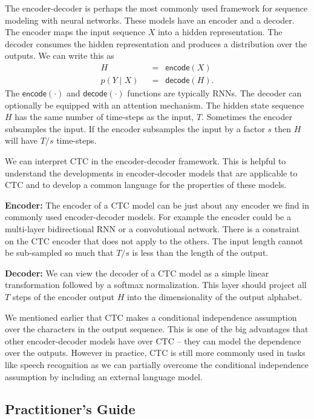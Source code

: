 The encoder-decoder is perhaps the most commonly used framework for sequence
modeling with neural networks. These models have an encoder and a decoder. The
encoder maps the input sequence $X$ into a hidden representation. The decoder
consumes the hidden representation and produces a distribution over the
outputs. We can write this as
\begin{align*}
H\enspace &= \enspace\textsf{encode}(X) \\[.5em]
p(Y \mid X)\enspace &= \enspace \textsf{decode}(H).
\end{align*}
The $\textsf{encode}(\cdot)$ and $\textsf{decode}(\cdot)$ functions are
typically RNNs. The decoder can optionally be equipped with an attention
mechanism. The hidden state sequence $H$ has the same number of time-steps as
the input, $T$. Sometimes the encoder subsamples the input. If the encoder
subsamples the input by a factor $s$ then $H$ will have $T/s$ time-steps.

We can interpret CTC in the encoder-decoder framework. This is helpful to
understand the developments in encoder-decoder models that are applicable to
CTC and to develop a common language for the properties of these models.

{\bf Encoder:} The encoder of a CTC model can be just about any encoder we find
in commonly used encoder-decoder models. For example the encoder could be a
multi-layer bidirectional RNN or a convolutional network. There is a constraint
on the CTC encoder that does not apply to the others. The input length cannot
be sub-sampled so much that $T/s$ is less than the length of the output.

{\bf Decoder:} We can view the decoder of a CTC model as a simple linear
transformation followed by a softmax normalization. This layer should project
all $T$ steps of the encoder output $H$ into the dimensionality of the output
alphabet.

We mentioned earlier that CTC makes a conditional independence assumption over
the characters in the output sequence. This is one of the big advantages that
other encoder-decoder models have over CTC -- they can model the dependence
over the outputs. However in practice, CTC is still more commonly used in tasks
like speech recognition as we can partially overcome the conditional
independence assumption by including an external language model.

\subsection{Practitioner's Guide}

